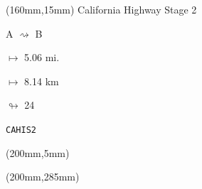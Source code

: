 \begin{textblock*}{40mm}(160mm,15mm)%
California Highway Stage 2
\par A $\rightsquigarrow$ B
\Large
\par$\mapsto$ 5.06 mi.
\par$\mapsto$ 8.14 km
\par$\looparrowright$ 24
\par\hfill\tiny\tt CAHIS2\\
\end{textblock*}
\begin{textblock*}{20mm}(200mm,5mm)%
\fbox{\thepage}
\end{textblock*}
\begin{textblock*}{20mm}(200mm,285mm)%
\fbox{\thepage}
\end{textblock*}
\null\newpage

